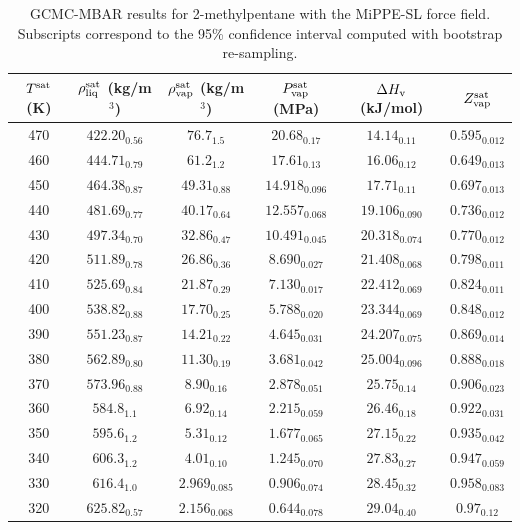 \documentclass[journal=jctc,manuscript=article]{achemso}
\begin{document}
\begin{table}[htb!]
	\caption{GCMC-MBAR results for 2-methylpentane with the MiPPE-SL force field. Subscripts correspond to the 95\% confidence interval computed with bootstrap re-sampling.}
	\begin{center}
		\begin{tabular}{|c|c|c|c|c|c|}
			\hline
			$T^{\rm sat}$ (K) & $\rho_{\rm liq}^{\rm sat}$ (kg/m$^3$) & $\rho_{\rm vap}^{\rm sat}$ (kg/m$^3$) & $P_{\rm vap}^{\rm sat}$ (MPa) & $\Delta H_{\rm v}$ (kJ/mol) & $Z_{\rm vap}^{\rm sat}$ \\ \hline
			470 & $422.20_{0.56}$ & $76.7_{1.5}$ & $20.68_{0.17}$ & $14.14_{0.11}$ & $0.595_{0.012}$ \\
			460 & $444.71_{0.79}$ & $61.2_{1.2}$ & $17.61_{0.13}$ & $16.06_{0.12}$ & $0.649_{0.013}$ \\
			450 & $464.38_{0.87}$ & $49.31_{0.88}$ & $14.918_{0.096}$ & $17.71_{0.11}$ & $0.697_{0.013}$ \\
			440 & $481.69_{0.77}$ & $40.17_{0.64}$ & $12.557_{0.068}$ & $19.106_{0.090}$ & $0.736_{0.012}$ \\
			430 & $497.34_{0.70}$ & $32.86_{0.47}$ & $10.491_{0.045}$ & $20.318_{0.074}$ & $0.770_{0.012}$ \\
			420 & $511.89_{0.78}$ & $26.86_{0.36}$ & $8.690_{0.027}$ & $21.408_{0.068}$ & $0.798_{0.011}$ \\
			410 & $525.69_{0.84}$ & $21.87_{0.29}$ & $7.130_{0.017}$ & $22.412_{0.069}$ & $0.824_{0.011}$ \\
			400 & $538.82_{0.88}$ & $17.70_{0.25}$ & $5.788_{0.020}$ & $23.344_{0.069}$ & $0.848_{0.012}$ \\
			390 & $551.23_{0.87}$ & $14.21_{0.22}$ & $4.645_{0.031}$ & $24.207_{0.075}$ & $0.869_{0.014}$ \\
			380 & $562.89_{0.80}$ & $11.30_{0.19}$ & $3.681_{0.042}$ & $25.004_{0.096}$ & $0.888_{0.018}$ \\
			370 & $573.96_{0.88}$ & $8.90_{0.16}$ & $2.878_{0.051}$ & $25.75_{0.14}$ & $0.906_{0.023}$ \\
			360 & $584.8_{1.1}$ & $6.92_{0.14}$ & $2.215_{0.059}$ & $26.46_{0.18}$ & $0.922_{0.031}$ \\
			350 & $595.6_{1.2}$ & $5.31_{0.12}$ & $1.677_{0.065}$ & $27.15_{0.22}$ & $0.935_{0.042}$ \\
			340 & $606.3_{1.2}$ & $4.01_{0.10}$ & $1.245_{0.070}$ & $27.83_{0.27}$ & $0.947_{0.059}$ \\
			330 & $616.4_{1.0}$ & $2.969_{0.085}$ & $0.906_{0.074}$ & $28.45_{0.32}$ & $0.958_{0.083}$ \\
			320 & $625.82_{0.57}$ & $2.156_{0.068}$ & $0.644_{0.078}$ & $29.04_{0.40}$ & $0.97_{0.12}$ \\
			\hline
		\end{tabular}
	\end{center}
\end{table}
\end{document}
